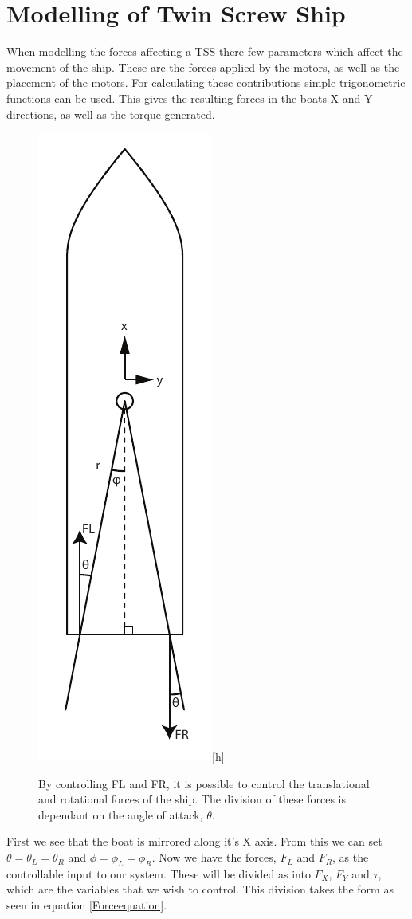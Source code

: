 \chapter{Modelling of Twin Screw Ship}
When modelling the forces affecting a \ac{TSS} there few parameters which affect the movement of the ship. These are the forces applied by the motors, as well as the placement of the motors. For calculating these contributions simple trigonometric functions can be used. This gives the resulting forces in the boats X and Y directions, as well as the torque generated.
\begin{figure}[htbp]
\includegraphics[angle=90]{img/boatmodel.pdf}[h]
\caption{By controlling FL and FR, it is possible to control the translational and rotational forces of the ship. The division of these forces is dependant on the angle of attack, $\theta$.}
\label{fig:forces}
\end{figure}
First we see that the boat is mirrored along it's X axis. From this we can set $\theta = \theta_L = \theta_R$ and $\phi = \phi_L = \phi_R$.  Now we have the forces, $F_L$ and $F_R$, as the controllable input to our system. These will be divided as into $F_X$, $F_Y$ and $\tau$, which are the variables that we wish to control. This division takes the form as seen in equation \eqref{Forceequation}.

